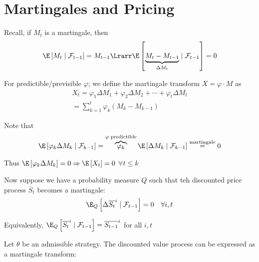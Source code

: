 \section{Martingales and Pricing}
\noindent Recall, if $M_t$ is a martingale, then 
\begin{equation*}
  \begin{gathered}
    \E\left[M_t\mid\mathcal{F}_{t-1}\right] = M_{t-1}\Lrarr \E\left[\underbrace{M_t-M_{t-1}}_{\substack{\Delta M_t}}\mid \mathcal{F}_{t-1}\right] = 0
  \end{gathered}
\end{equation*}
\par\bigskip
\noindent For predictible/previsible $\varphi$; we define the martingale transform $X = \varphi\cdot M$ as
\begin{equation*}
  \begin{gathered}
    X_t = \varphi_1\Delta M_1 + \varphi_2\Delta M_2+\cdots +\varphi_t\Delta M_t\\
    =\sum_{k=1}^{t}\varphi_k(M_k-M_{k-1})
  \end{gathered}
\end{equation*}\par
\noindent Note that
\begin{equation*}
  \begin{gathered}
    \E\left[\varphi_k\Delta M_k\mid\mathcal{F}_{k-1}\right] = \overbrace{\varphi_k}^{\text{$\varphi$ predictible}}\E\left[\Delta M_k\mid\mathcal{F}_{k-1}\right] \stackrel{\text{martingale}}{=} 0
  \end{gathered}
\end{equation*}\par
\noindent Thus $\E\left[\varphi_k\Delta M_k\right] = 0\Rightarrow \E\left[X_t\right] = 0$ $\forall t\leq k$
\par\bigskip
\noindent Now suppose we have a probability measure $Q$ such that teh discounted price process $\overline{S}_t$ becomes a martingale:
\begin{equation*}
  \begin{gathered}
    \E_Q\left[\Delta\overline{S_t}^i\mid\mathcal{F}_{t-1}\right] = 0\quad\forall i,t
  \end{gathered}
\end{equation*}\par
\noindent Equivalently, $\E_Q\left[\overline{S_t}^i\mid\mathcal{F}_{t-1}\right] = \overline{S_{t-1}}^i$ for all $i,t$\par
\noindent Let $\theta$ be an admissible strategy. The discounted value process can be expressed as a martingale transform:
